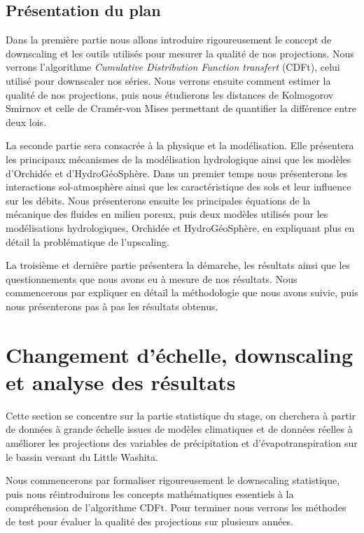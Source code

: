 \documentclass[a4paper,11pt]{article}
\numberwithin{equation}{section}
\begin{document}
\subsection{Présentation du plan}
\label{ch:presentation plan}

Dans la première partie nous allons introduire rigoureusement le concept de downscaling et les outils utilisés pour mesurer la qualité de nos projections. Nous verrons l'algorithme \textit{Cumulative Distribution Function transfert} (CDFt), celui utilisé pour downscaler nos séries. Nous verrons ensuite comment estimer la qualité de nos projections, puis nous étudierons les distances de Kolmogorov Smirnov et celle de Cramér-von Mises permettant de quantifier la différence entre deux lois. 

La seconde partie sera consacrée à la physique et la modélisation. Elle présentera les principaux mécanismes de la modélisation hydrologique ainsi que les modèles d'Orchidée et d'HydroGéoSphère. Dans un premier temps nous présenterons les interactions sol-atmosphère ainsi que les caractéristique des sols et leur influence sur les débits. Nous présenterons ensuite les principales équations de la mécanique des fluides en milieu poreux, puis deux modèles utilisés pour les modélisations hydrologiques, Orchidée et HydroGéoSphère, en expliquant plus en détail la problématique de l'upscaling.

La troisième et dernière partie présentera la démarche, les résultats ainsi que les questionnements que nous avons eu à mesure de nos résultats. Nous commencerons par expliquer en détail la méthodologie que nous avons suivie, puis nous présenterons pas à pas les résultats obtenus.


\newpage
\section{Changement d'échelle, downscaling et analyse des résultats}
\label{ch:downscaling}
Cette section se concentre sur la partie statistique du stage, on cherchera à partir de données à grande échelle issues de modèles climatiques et de données réelles à améliorer les projections des variables de précipitation et d'évapotranspiration sur le bassin versant du Little Washita. 

Nous commencerons par formaliser rigoureusement le downscaling statistique, puis nous réintroduirons les concepts mathématiques essentiels à la compréhension de l'algorithme CDFt. Pour terminer nous verrons les méthodes de test pour évaluer la qualité des projections sur plusieurs années.
\end{document}
